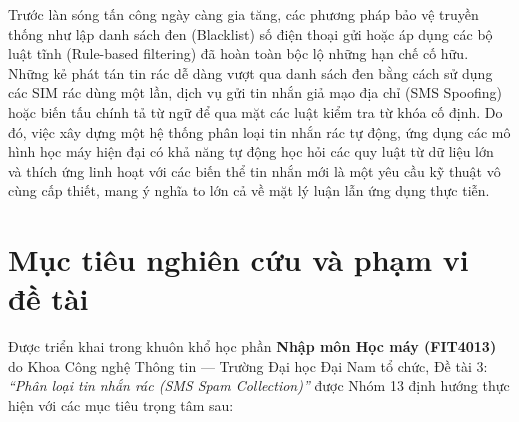 Trước làn sóng tấn công ngày càng gia tăng, các phương pháp bảo vệ truyền thống như lập danh sách đen (Blacklist) số điện thoại gửi hoặc áp dụng các bộ luật tĩnh (Rule-based filtering) đã hoàn toàn bộc lộ những hạn chế cố hữu. Những kẻ phát tán tin rác dễ dàng vượt qua danh sách đen bằng cách sử dụng các SIM rác dùng một lần, dịch vụ gửi tin nhắn giả mạo địa chỉ (SMS Spoofing) hoặc biến tấu chính tả từ ngữ để qua mặt các luật kiểm tra từ khóa cố định. Do đó, việc xây dựng một hệ thống phân loại tin nhắn rác tự động, ứng dụng các mô hình học máy hiện đại có khả năng tự động học hỏi các quy luật từ dữ liệu lớn và thích ứng linh hoạt với các biến thể tin nhắn mới là một yêu cầu kỹ thuật vô cùng cấp thiết, mang ý nghĩa to lớn cả về mặt lý luận lẫn ứng dụng thực tiễn.

\section{Mục tiêu nghiên cứu và phạm vi đề tài}
\label{sec:muc-tieu}

Được triển khai trong khuôn khổ học phần \textbf{Nhập môn Học máy (FIT4013)} do Khoa Công nghệ Thông tin --- Trường Đại học Đại Nam tổ chức, Đề tài 3: \textit{“Phân loại tin nhắn rác (SMS Spam Collection)”} được Nhóm 13 định hướng thực hiện với các mục tiêu trọng tâm sau:

